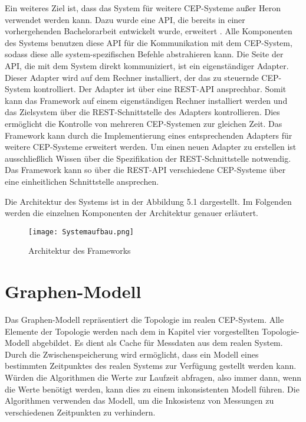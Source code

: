 Ein weiteres Ziel ist, dass das System für weitere CEP-Systeme außer Heron verwendet werden kann.
Dazu wurde eine API, die bereits in einer vorhergehenden Bachelorarbeit entwickelt wurde, erweitert \cite{goggel_vergleich_2018}.
Alle Komponenten des Systems benutzen diese API für die Kommunikation mit dem CEP-System, sodass diese alle system-spezifischen Befehle abstrahieren kann.
Die Seite der API, die mit dem System direkt kommuniziert, ist ein eigenständiger Adapter.
Dieser Adapter wird auf dem Rechner installiert, der das zu steuernde CEP-System kontrolliert.
Der Adapter ist über eine REST-API ansprechbar.
Somit kann das Framework auf einem eigenständigen Rechner installiert werden und das Zielsystem über die REST-Schnittstelle des Adapters kontrollieren.
Dies ermöglicht die Kontrolle von mehreren CEP-Systemen zur gleichen Zeit.
Das Framework kann durch die Implementierung eines entsprechenden Adapters für weitere CEP-Systeme erweitert werden.
Um einen neuen Adapter zu erstellen ist ausschließlich Wissen über die Spezifikation der REST-Schnittstelle notwendig.
Das Framework kann so über die REST-API verschiedene CEP-Systeme über eine einheitlichen Schnittstelle ansprechen.

Die Architektur des Systems ist in der Abbildung 5.1 dargestellt.
Im Folgenden werden die einzelnen Komponenten der Architektur genauer erläutert.

\begin{figure}
  \centering
  \texttt{[image: Systemaufbau.png]}
  \caption{Architektur des Frameworks}
  \label{fig:Architektur}
\end{figure}

\section{Graphen-Modell}
Das Graphen-Modell repräsentiert die Topologie im realen CEP-System.
Alle Elemente der Topologie werden nach dem in Kapitel vier vorgestellten Topologie-Modell abgebildet.
Es dient als Cache für Messdaten aus dem realen System.
Durch die Zwischenspeicherung wird ermöglicht, dass ein Modell eines bestimmten Zeitpunktes des realen Systems zur Verfügung gestellt werden kann. 
Würden die Algorithmen die Werte zur Laufzeit abfragen, also immer dann, wenn die Werte benötigt werden, kann dies zu einem inkonsistenten Modell führen.
Die Algorithmen verwenden das Modell, um die Inkosistenz von Messungen zu verschiedenen Zeitpunkten zu verhindern.


